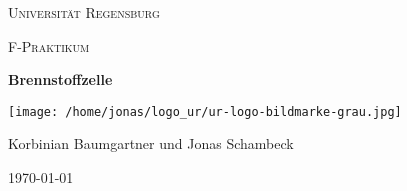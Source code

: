 \begin{titlepage}
	\centering
	{\scshape \LARGE Universität Regensburg \par}
	\vspace{1cm}
	{\scshape\Large F-Praktikum\par}
	\vspace{1.5cm}
	{\huge\bfseries Brennstoffzelle\par}
	\vspace{2cm}
	\texttt{[image: /home/jonas/logo\_ur/ur-logo-bildmarke-grau.jpg]}\par
	\vfill
	{\large Korbinian Baumgartner und Jonas Schambeck\par}
	
	\vfill

	{\large \today\par}
\end{titlepage}
